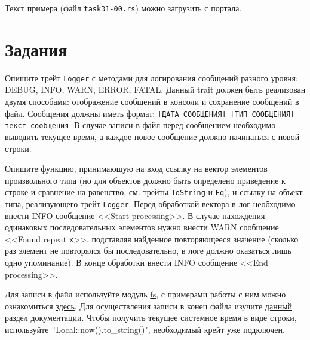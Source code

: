 \documentclass[a4paper, 10pt]{extarticle}
\begin{document}

Текст примера (файл \verb"task31-00.rs") можно загрузить с портала.

\section{Задания}

\begin{tsk}[Логгер]
    Опишите трейт \verb|Logger| с методами для логирования сообщений разного уровня: DEBUG, INFO, WARN, ERROR, FATAL. Данный trait должен быть реализован двумя способами: отображение сообщений в консоли и сохранение сообщений в файл. Сообщения должны иметь формат: \verb|[ДАТА СООБЩЕНИЯ] [ТИП СООБЩЕНИЯ] текст сообщения|. В случае записи в файл перед сообщением необходимо выводить текущее время, а каждое новое сообщение должно начинаться с новой строки.

    Опишите функцию, принимающую на вход ссылку на вектор элементов произвольного типа (но для объектов должно быть определено приведение к строке и сравнение на равенство, см. трейты \verb|ToString| и \verb|Eq|), и ссылку на объект типа, реализующего трейт \verb|Logger|. Перед обработкой вектора в лог необходимо внести INFO сообщение <<Start processing>>. В случае нахождения одинаковых последовательных элементов нужно внести WARN сообщение <<Found repeat \verb|x|>>, подставляя найденное повторяющееся значение (сколько раз элемент не повторялся бы последовательно, в логе должно оказаться лишь одно упоминание). В конце обработки внести INFO сообщение <<End processing>>.

    Для записи в файл используйте модуль \href{https://doc.rust-lang.org/std/fs/index.html}{fs}, с примерами работы с ним можно ознакомиться \href{https://metanit.com/rust/tutorial/14.2.php}{здесь}. Для осуществления записи в конец файла изучите \href{https://doc.rust-lang.org/std/fs/struct.OpenOptions.html}{данный} раздел документации. Чтобы получить текущее системное время в виде строки, используйте \texttt"Local::now().to_string()", необходимый крейт уже подключен.
\end{tsk}
\end{document}
